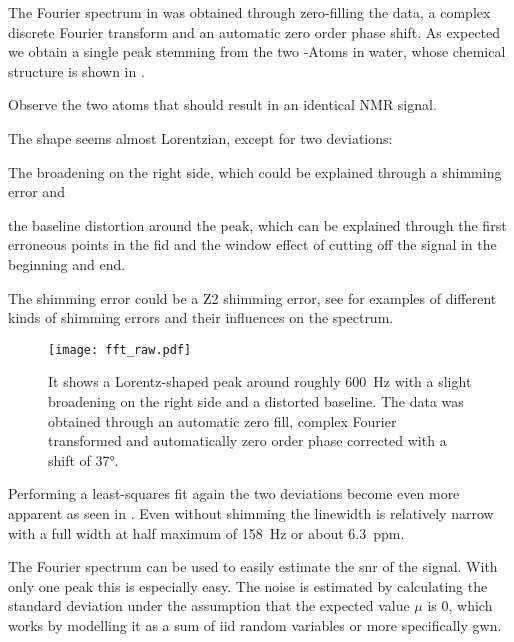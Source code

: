 The Fourier spectrum in  was obtained through zero-filling the data, a complex discrete Fourier transform and an automatic zero order phase shift. As expected we obtain a single peak stemming from the two -Atoms in water, whose chemical structure is shown in .

\begin{marginfigure}
    \centering
    
    \caption{ Observe the two  atoms that should result in an identical NMR signal.}
\end{marginfigure}

The shape seems almost Lorentzian, except for two deviations: %
\begin{enumerate*}[label=(\arabic*)]
    \item The broadening on the right side, which could be explained through a shimming error and
    \item the baseline distortion around the peak, which can be explained through the first erroneous points in the \acrshort{fid} and the window effect of cutting off the signal in the beginning and end.
\end{enumerate*}%
The shimming error could be a Z2 shimming error, see  for examples of different kinds of shimming errors and their influences on the spectrum.

\begin{figure}[h!bt]
    \centering
    \texttt{[image: fft\_raw.pdf]}
    \caption{ It shows a Lorentz-shaped peak around roughly \qty{600}{\hertz} with a slight broadening on the right side and a distorted baseline. The data was obtained through an automatic zero fill, complex Fourier transformed and automatically zero order phase corrected with a shift of \ang{37}.}
\end{figure}

Performing a least-squares fit again the two deviations become even more apparent as seen in . Even without shimming the linewidth is relatively narrow with a full width at half maximum of \qty{158}{\hertz} or about \qty{6.3}{ppm}.

The Fourier spectrum can be used to easily estimate the \acrfull{snr} of the signal. With only one peak this is especially easy. The noise is estimated by calculating the standard deviation under the assumption that the expected value \(\mu{}\) is \(0\), which works by modelling it as a sum of \acrfull{iid} random variables or more specifically \acrfull{gwn}.

